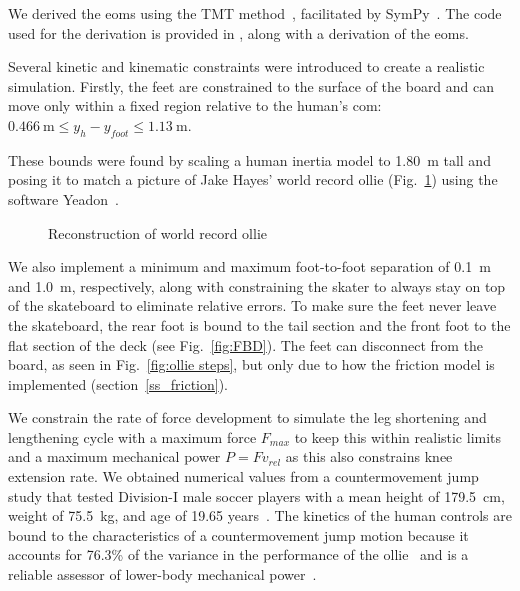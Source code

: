 \documentclass[default,iicol,pdflatex]{sn-jnl}
\begin{document}
We derived the \glspl{eom} using the TMT method~\cite{vallery_heike_advanced_2018}, facilitated by SymPy~\cite{meurer_sympy_2017}.
The code used for the derivation is provided in \cite{heinen_optimal_2022}, along with a derivation of the \glspl{eom}.

Several kinetic and kinematic constraints were introduced to create a realistic simulation. Firstly, the feet are constrained to the surface of the board and can move only within a fixed region relative to the human’s \gls{com}: $\SI{0.466}{\meter} \leq y_h - y_{foot} \leq \SI{1.13}{\meter}$.

These bounds were found by scaling a human inertia model to \SI{1.80}{\meter} tall and posing it to match a picture of Jake Hayes' world record ollie  (Fig.~\ref{fig:f_record}) using the software Yeadon~\cite{Dembia2015}. 

\begin{figure}
    \centering
    \quad
    \caption{Reconstruction of world record ollie} 
    \label{fig:f_record}
\end{figure}

We also implement a minimum and maximum foot-to-foot separation of \SI{0.1}{\meter} and \SI{1.0}{\meter}, respectively, along with constraining the skater to always stay on top of the skateboard to eliminate relative errors.
To make sure the feet never leave the skateboard, the rear foot is bound to the tail section and the front foot to the flat section of the deck (see Fig.~\ref{fig:FBD}).
The feet can disconnect from the board, as seen in Fig.~\ref{fig:ollie steps}, but only due to how the friction model is implemented (section~\ref{ss_friction}).

We constrain the rate of force development to simulate the leg shortening and lengthening cycle with a maximum force $F_{max}$ to keep this within realistic limits and a maximum mechanical power $P = F v_{rel}$ as this also constrains knee extension rate. We obtained numerical values from a countermovement jump study that tested Division-I male soccer players with a mean height of \SI{179.5}{\centi\meter}, weight of \SI{75.5}{\kilo\gram}, and age of 19.65 years~\cite{barker_relationships_2018}. The kinetics of the human controls are bound to the characteristics of a countermovement jump motion because it accounts for 76.3\% of the variance in the performance of the ollie~\cite{candotti_lower_2012} and is a reliable assessor of lower-body mechanical power~\cite{barker_relationships_2018}. 
\end{document}
